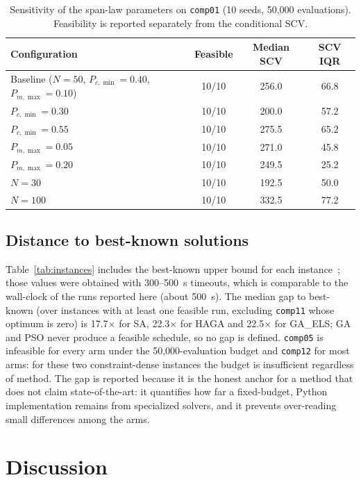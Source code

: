 \documentclass[journal]{IEEEtran}
\newcommand{\code}[1]{\texttt{#1}}
\begin{document}
\begin{table}[!t]
\caption{Sensitivity of the span-law parameters on \code{comp01} (10 seeds, 50{,}000 evaluations). Feasibility is reported separately from the conditional SCV.}
\label{tab:sensitivity}
\centering
\small
\begin{tabular}{l c c c}
\toprule
Configuration & Feasible & Median SCV & SCV IQR \\
\midrule
Baseline ($N=50$, $P_{c,\min}=0.40$, $P_{m,\max}=0.10$) & 10/10 & 256.0 & 66.8 \\
$P_{c,\min}=0.30$ & 10/10 & 200.0 & 57.2 \\
$P_{c,\min}=0.55$ & 10/10 & 275.5 & 65.2 \\
$P_{m,\max}=0.05$ & 10/10 & 271.0 & 45.8 \\
$P_{m,\max}=0.20$ & 10/10 & 249.5 & 25.2 \\
$N=30$ & 10/10 & 192.5 & 50.0 \\
$N=100$ & 10/10 & 332.5 & 77.2 \\
\bottomrule
\end{tabular}
\end{table}

\subsection{Distance to best-known solutions}
Table~\ref{tab:instances} includes the best-known upper bound for each instance~\cite{ceschia2022educational}; those values were obtained with 300--500~s timeouts, which is comparable to the wall-clock of the runs reported here (about 500~s). The median gap to best-known (over instances with at least one feasible run, excluding \code{comp11} whose optimum is zero) is 17.7$\times$ for SA, 22.3$\times$ for HAGA and 22.5$\times$ for GA\_ELS; GA and PSO never produce a feasible schedule, so no gap is defined. \code{comp05} is infeasible for every arm under the 50{,}000-evaluation budget and \code{comp12} for most arms: for these two constraint-dense instances the budget is insufficient regardless of method. The gap is reported because it is the honest anchor for a method that does not claim state-of-the-art: it quantifies how far a fixed-budget, Python implementation remains from specialized solvers, and it prevents over-reading small differences among the arms.

\section{Discussion}
\label{sec:discussion}
\end{document}
